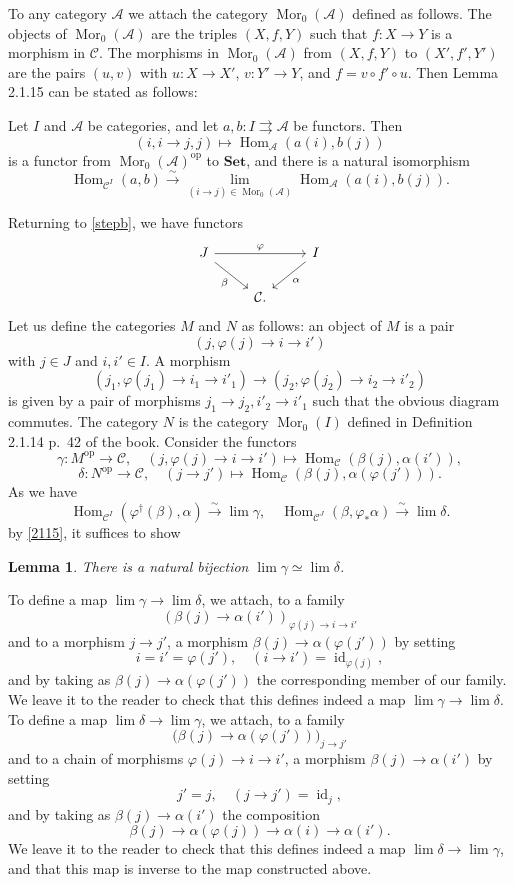\documentclass[12pt]{article}
\newtheorem{lem}[thm]{Lemma}
\theoremstyle{remark}%
\newcommand{\n}{\noindent}
\newcommand{\A}{\mathcal A}
\newcommand{\C}{\mathcal C}
\newcommand{\Set}{\textbf{Set}}
\newcommand{\p}{\varphi}
\newcommand{\pa}{\rightrightarrows}
\newcommand{\xr}{\xrightarrow}
\newcommand{\be}{\begin{equation}}
\newcommand{\ee}{\end{equation}}
\DeclareMathOperator{\id}{id}
\DeclareMathOperator{\h}{Hom}
\DeclareMathOperator{\Mor}{Mor}
\DeclareMathOperator{\op}{op}
\begin{document}
To any category $\A$ we attach the category $\Mor_0(\A)$ defined as follows. The objects of $\Mor_0(\A)$ are the triples $(X,f,Y)$ such that $f:X\to Y$ is a morphism in $\C$. The morphisms in $\Mor_0(\A)$ from $(X,f,Y)$ to $(X',f',Y')$ are the pairs $(u,v)$ with $u:X\to X'$, $v:Y'\to Y$, and $f=v\circ f'\circ u$. Then Lemma 2.1.15 can be stated as follows: 

Let $I$ and $\A$ be categories, and let $a,b:I\pa\A$ be functors. Then 
$$
(i,i\to j,j)\mapsto\h_\A(a(i),b(j))
$$ 
is a functor from $\Mor_0(\A)^{\op}$ to $\Set$, and there is a natural isomorphism 
% 
\be\label{2115} 
\h_{\C^I}(a,b)\xr\sim\lim_{(i\to j)\in\Mor_0(\A)}\h_\A(a(i),b(j)).
\ee
% 

Returning to \eqref{stepb}, we have functors 
$$
\begin{tikzcd}
J\ar{rr}{\p}\ar{dr}[swap]{\beta}&&I\ar{dl}{\alpha}\\ 
&\C.
\end{tikzcd}
$$ 
Let us define the categories $M$ and $N$ as follows: an object of $M$ is a pair 
$$
(j,\p(j)\to i\to i')
$$ 
with $j\in J$ and $i,i'\in I$. A morphism 
$$
(j_1,\p(j_1)\to i_1\to i'_1)\to(j_2,\p(j_2)\to i_2\to i'_2)
$$ 
is given by a pair of morphisms $j_1\to j_2,i'_2\to i'_1$ such that the obvious diagram commutes. The category $N$ is the category $\Mor_0(I)$ defined in Definition 2.1.14 p.~42 of the book. Consider the functors 
$$
\gamma:M^{\op}\to\C,\quad(j,\p(j)\to i\to i')\mapsto\h_\C(\beta(j),\alpha(i')), 
$$ 
$$
\delta:N^{\op}\to\C,\quad(j\to j')\mapsto\h_\C(\beta(j),\alpha(\p(j'))). 
$$ 
As we have 
$$
\h_{\C^I}(\p^\dagger(\beta),\alpha)\xr\sim\lim\gamma,\quad
\h_{\C^J}(\beta,\p_*\alpha)\xr\sim\lim\delta. 
$$ 
by \eqref{2115}, it suffices to show 
%
\begin{lem} 
%
There is a natural bijection $\lim\gamma\simeq\lim\delta$. 
%
\end{lem} 
%
\n{\em Proof.} To define a map $\lim\gamma\to\lim\delta$, we attach, to a family 
$$
(\beta(j)\to\alpha(i'))_{\p(j)\to i\to i'}
$$ 
and to a morphism $j\to j'$, a morphism $\beta(j)\to\alpha(\p(j'))$ by setting 
$$
i=i'=\p(j'),\quad(i\to i')=\id_{\p(j)},
$$ 
and by taking as $\beta(j)\to\alpha(\p(j'))$ the corresponding member of our family. We leave it to the reader to check that this defines indeed a map $\lim\gamma\to\lim\delta$. To define a map $\lim\delta\to\lim\gamma$, we attach, to a family 
$$
\big(\beta(j)\to\alpha(\p(j'))\big)_{j\to j'}
$$ 
and to a chain of morphisms $\p(j)\to i\to i'$, a morphism $\beta(j)\to\alpha(i')$ by setting 
$$
j'=j,\quad(j\to j')=\id_{j},
$$ 
and by taking as $\beta(j)\to\alpha(i')$ the composition 
$$
\beta(j)\to\alpha(\p(j))\to\alpha(i)\to\alpha(i'). 
$$ 
We leave it to the reader to check that this defines indeed a map $\lim\delta\to\lim\gamma$, and that this map is inverse to the map constructed above. 
% 
\end{document}

